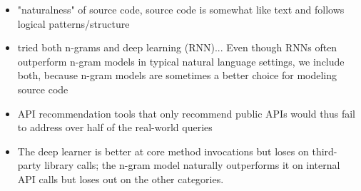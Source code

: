 \begin{itemize}
    \item "naturalness" of source code, source code is somewhat like text and follows logical patterns/structure
    \item tried both n-grams and deep learning (RNN)... Even though RNNs often outperform n-gram models in typical natural language settings, we include both, because n-gram models are sometimes a better choice for modeling source code
    \item API recommendation tools that only recommend public APIs would thus fail to address over half of the real-world queries
    \item The deep learner is better at core method invocations but loses on third-party library calls; the n-gram model naturally outperforms it on internal API calls but loses out on the other categories.
\end{itemize}

